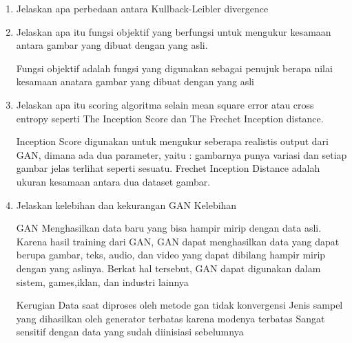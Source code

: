 \begin{enumerate}
\item Jelaskan apa perbedaan antara Kullback-Leibler divergence

\item Jelaskan apa itu fungsi objektif yang berfungsi untuk mengukur kesamaan antara gambar yang dibuat dengan yang asli.
\par Fungsi objektif adalah fungsi yang digunakan sebagai penujuk berapa nilai kesamaan anatara gambar yang dibuat dengan yang asli

\item Jelaskan apa itu scoring algoritma selain mean square error atau cross entropy seperti The Inception Score dan The Frechet Inception distance.
\par Inception Score digunakan untuk mengukur seberapa realistis output dari GAN, dimana ada dua parameter, yaitu : gambarnya punya variasi dan setiap gambar jelas terlihat seperti sesuatu. Frechet Inception Distance adalah ukuran kesamaan antara dua dataset gambar. 

\item Jelaskan kelebihan dan kekurangan GAN
Kelebihan
\par GAN Menghasilkan data baru yang bisa hampir mirip dengan data asli. Karena hasil training dari GAN, GAN dapat menghasilkan data yang dapat berupa gambar, teks, audio, dan video yang dapat dibilang hampir mirip dengan yang aslinya. Berkat hal tersebut, GAN dapat digunakan dalam sistem, games,iklan, dan industri lainnya


Kerugian
Data saat diproses oleh metode gan tidak konvergensi
Jenis sampel yang dihasilkan oleh generator terbatas karena modenya terbatas
Sangat sensitif dengan data yang sudah diinisiasi sebelumnya
\end{enumerate}


